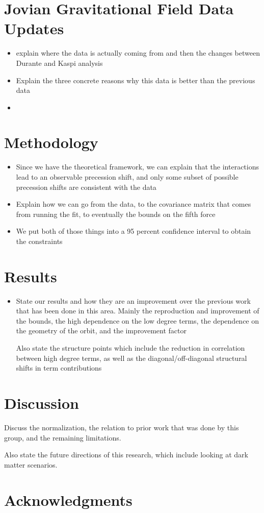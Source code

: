 \documentclass[11pt,a4paper]{article}
\begin{document}
\section{Jovian Gravitational Field Data Updates}
\begin{itemize}
    \item explain where the data is actually coming from and then the changes between Durante and Kaspi analysis
    \item Explain the three concrete reasons why this data is better than the previous data
    \item 
\end{itemize}

\section{Methodology}
\begin{itemize}
    \item Since we have the theoretical framework, we can explain that the interactions lead to an observable precession shift, and only some subset of possible precession shifts are consistent with the data
    \item Explain how we can go from the data, to the covariance matrix that comes from running the fit, to eventually the bounds on the fifth force
    \item We put both of those things into a 95 percent confidence interval to obtain the constraints
\end{itemize}

\section{Results}
\begin{itemize}
    \item State our results and how they are an improvement over the previous work that has been done in this area.
    Mainly the reproduction and improvement of the bounds, the high dependence on the low degree terms, the dependence on the geometry of the orbit, and the improvement factor

    Also state the structure points which include the reduction in correlation between high degree terms, as well as the diagonal/off-diagonal structural shifts in term contributions
\end{itemize}



\section{Discussion}
Discuss the normalization, the relation to prior work that was done by this group, and the remaining limitations. 

Also state the future directions of this research, which include looking at dark matter scenarios. 

\section{Acknowledgments}



\end{document}
